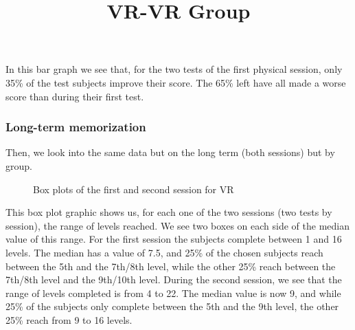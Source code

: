 \documentclass[12pt, openany, twocolumn]{article}
\begin{document}
            In this bar graph we see that, for the two tests of the first physical session, only 35\% of the test subjects improve their score. 
            The 65\% left have all made a worse score than during their first test.
       
        \subsubsection{Long-term memorization}
        Then, we look into the same data but on the long term (both sessions) but by group.
        \\
    
            \noindent \title{\textbf{VR-VR Group}}
                \begin{figure}[H]
                    \setlength{\fboxsep}{0pt}
                    \setlength{\fboxrule}{1pt}
                    \caption{Box plots of the first and second session for VR}
                \end{figure}

            This box plot graphic shows us, for each one of the two sessions (two tests by session), the range of levels reached. We see two boxes on each side of the median value of this range.
            For the first session the subjects complete between 1 and 16 levels.
            The median has a value of 7.5, and 25\% of the chosen subjects reach between the 5th and the 7th/8th level, while the other 25\% reach between the 7th/8th level and the 9th/10th level.
            During the second session, we see that the range of levels completed is from 4 to 22. The median value is now 9, and while 25\% of the subjects only complete between the 5th and the 9th level, the other 25\% reach from 9 to 16 levels.
            
\end{document}
